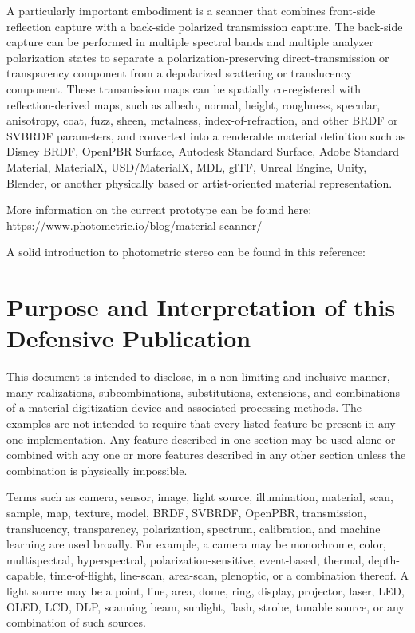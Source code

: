 \documentclass[11pt, twoside, listof=totocnumbered, bibliography=totocnumbered]{scrartcl}
\begin{document}
	A particularly important embodiment is a scanner that combines front-side reflection capture with a back-side polarized transmission capture. The back-side capture can be performed in multiple spectral bands and multiple analyzer polarization states to separate a polarization-preserving direct-transmission or transparency component from a depolarized scattering or translucency component. These transmission maps can be spatially co-registered with reflection-derived maps, such as albedo, normal, height, roughness, specular, anisotropy, coat, fuzz, sheen, metalness, index-of-refraction, and other BRDF or SVBRDF parameters, and converted into a renderable material definition such as Disney BRDF, OpenPBR Surface, Autodesk Standard Surface, Adobe Standard Material, MaterialX, USD/MaterialX, MDL, glTF, Unreal Engine, Unity, Blender, or another physically based or artist-oriented material representation. \cite{DISNEY_BRDF,OPENPBR,MATERIALX}
	
	More information on the current prototype can be found here:\\
	\href{https://www.photometric.io/blog/material-scanner/}{https://www.photometric.io/blog/material-scanner/}
	
	A solid introduction to photometric stereo can be found in this reference: \cite{SURVEY}
	
	\section{Purpose and Interpretation of this Defensive Publication}
	This document is intended to disclose, in a non-limiting and inclusive manner, many realizations, subcombinations, substitutions, extensions, and combinations of a material-digitization device and associated processing methods. The examples are not intended to require that every listed feature be present in any one implementation. Any feature described in one section may be used alone or combined with any one or more features described in any other section unless the combination is physically impossible.
	
	Terms such as camera, sensor, image, light source, illumination, material, scan, sample, map, texture, model, BRDF, SVBRDF, OpenPBR, transmission, translucency, transparency, polarization, spectrum, calibration, and machine learning are used broadly. For example, a camera may be monochrome, color, multispectral, hyperspectral, polarization-sensitive, event-based, thermal, depth-capable, time-of-flight, line-scan, area-scan, plenoptic, or a combination thereof. A light source may be a point, line, area, dome, ring, display, projector, laser, LED, OLED, LCD, DLP, scanning beam, sunlight, flash, strobe, tunable source, or any combination of such sources.
	
\end{document}
